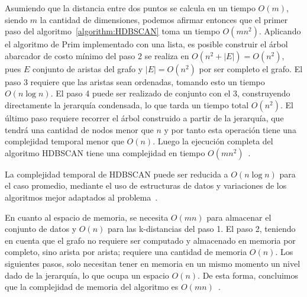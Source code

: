 Asumiendo que la distancia entre dos puntos se calcula en un tiempo $O(m)$, siendo $m$ la cantidad de dimensiones, podemos afirmar entonces que el primer paso del algoritmo~\ref{algorithm:HDBSCAN} toma un tiempo $O(m n^2)$.
Aplicando el algoritmo de Prim implementado con una lista, es posible construir el árbol abarcador de costo mínimo del paso 2 se realiza en $O(n^2+|E|) = O(n^2)$, pues $E$ conjunto de aristas del grafo y $|E|=O(n^2)$ por ser completo el grafo.
El paso 3 requiere que las aristas sean ordenadas, tomando esto un tiempo $O(n\log n)$.
El paso 4 puede ser realizado de conjunto con el 3, construyendo directamente la jerarquía condensada, lo que tarda un tiempo total $O(n^2)$.
El último paso requiere recorrer el árbol construido a partir de la jerarquía, que tendrá una cantidad de nodos menor que $n$ y por tanto esta operación tiene una complejidad temporal menor que $O(n)$.
Luego la ejecución completa del algoritmo HDBSCAN tiene una complejidad en tiempo $O(m n^2)$~\cite{Campello15}.

La complejidad temporal de HDBSCAN puede ser reducida a $O(n\log n)$ para el caso promedio, mediante el uso de estructuras de datos y variaciones de los algoritmos mejor adaptados al problema~\cite{McInnes17-2}.

En cuanto al espacio de memoria, se necesita $O(m n)$ para almacenar el conjunto de datos y $O(n)$ para las k-distancias del paso 1.
El paso 2, teniendo en cuenta que el grafo no requiere ser computado y almacenado en memoria por completo, sino arista por arista;
requiere una cantidad de memoria $O(n)$.
Los siguientes pasos, solo necesitan tener en memoria en un mismo momento un nivel dado de la jerarquía, lo que ocupa un espacio $O(n)$.
De esta forma, concluimos que la complejidad de memoria del algoritmo es $O(m n)$~\cite{Campello15}.
